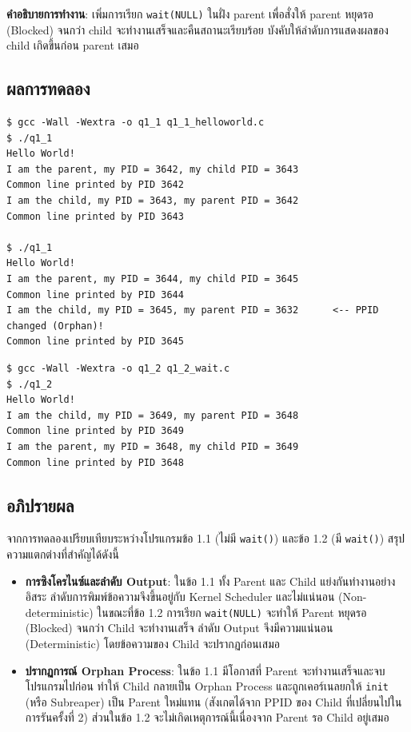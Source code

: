 \documentclass[a4paper,12pt]{article}
\newcommand{\code}[1]{\texttt{#1}}
\begin{document}
\textbf{คำอธิบายการทำงาน}: เพิ่มการเรียก \code{wait(NULL)} ในฝั่ง parent เพื่อสั่งให้ parent หยุดรอ (Blocked) จนกว่า child จะทำงานเสร็จและคืนสถานะเรียบร้อย บังคับให้ลำดับการแสดงผลของ child เกิดขึ้นก่อน parent เสมอ

\newpage

\subsection{ผลการทดลอง}

\begin{lstlisting}[style=terminal,caption={ผลลัพธ์ของข้อ 1.1 (ไม่มี wait())}]
$ gcc -Wall -Wextra -o q1_1 q1_1_helloworld.c
$ ./q1_1
Hello World!
I am the parent, my PID = 3642, my child PID = 3643
Common line printed by PID 3642
I am the child, my PID = 3643, my parent PID = 3642
Common line printed by PID 3643

$ ./q1_1
Hello World!
I am the parent, my PID = 3644, my child PID = 3645
Common line printed by PID 3644
I am the child, my PID = 3645, my parent PID = 3632      <-- PPID changed (Orphan)!
Common line printed by PID 3645
\end{lstlisting}

\begin{lstlisting}[style=terminal,caption={ผลลัพธ์ของข้อ 1.2 (มี wait())}]
$ gcc -Wall -Wextra -o q1_2 q1_2_wait.c
$ ./q1_2
Hello World!
I am the child, my PID = 3649, my parent PID = 3648
Common line printed by PID 3649
I am the parent, my PID = 3648, my child PID = 3649
Common line printed by PID 3648
\end{lstlisting}

\subsection{อภิปรายผล}

จากการทดลองเปรียบเทียบระหว่างโปรแกรมข้อ 1.1 (ไม่มี \code{wait()}) และข้อ 1.2 (มี \code{wait()}) สรุปความแตกต่างที่สำคัญได้ดังนี้

\begin{itemize}[leftmargin=*]
  \item \textbf{การซิงโครไนซ์และลำดับ Output}:
        ในข้อ 1.1 ทั้ง Parent และ Child แย่งกันทำงานอย่างอิสระ ลำดับการพิมพ์ข้อความจึงขึ้นอยู่กับ Kernel Scheduler และไม่แน่นอน (Non-deterministic) ในขณะที่ข้อ 1.2 การเรียก \code{wait(NULL)} จะทำให้ Parent หยุดรอ (Blocked) จนกว่า Child จะทำงานเสร็จ ลำดับ Output จึงมีความแน่นอน (Deterministic) โดยข้อความของ Child จะปรากฏก่อนเสมอ

  \item \textbf{ปรากฏการณ์ Orphan Process}:
        ในข้อ 1.1 มีโอกาสที่ Parent จะทำงานเสร็จและจบโปรแกรมไปก่อน ทำให้ Child กลายเป็น Orphan Process และถูกเคอร์เนลยกให้ \code{init} (หรือ Subreaper) เป็น Parent ใหม่แทน (สังเกตได้จาก PPID ของ Child ที่เปลี่ยนไปในการรันครั้งที่ 2) ส่วนในข้อ 1.2 จะไม่เกิดเหตุการณ์นี้เนื่องจาก Parent รอ Child อยู่เสมอ
\end{itemize}
\end{document}
